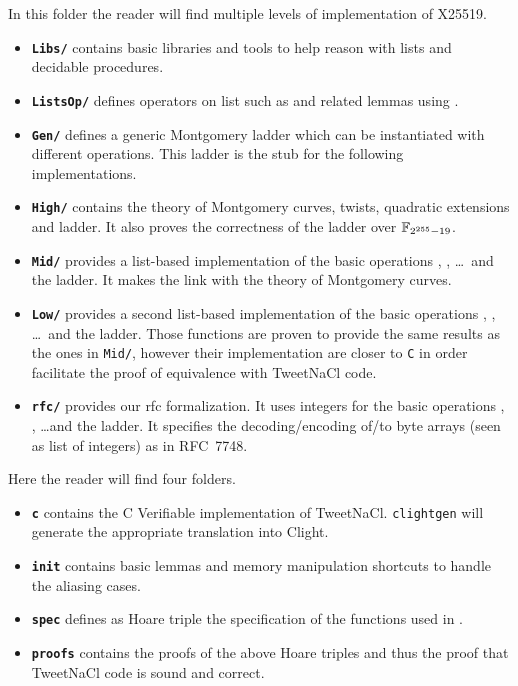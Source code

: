 In this folder the reader will find multiple levels of implementation of X25519.
\begin{itemize}
  \item \textbf{\texttt{Libs/}} contains basic libraries and tools to help
        reason with lists and decidable procedures.
  \item \textbf{\texttt{ListsOp/}} defines operators on list such as
         and related lemmas using \eg {}.
  \item \textbf{\texttt{Gen/}} defines a generic Montgomery ladder which can be
        instantiated with different operations. This ladder is the stub for the
        following implementations.
  \item \textbf{\texttt{High/}} contains the theory of Montgomery curves,
        twists, quadratic extensions and ladder.
        It also proves the correctness of the ladder over $\mathbb{F}_{2^{255}-19}$.
  \item \textbf{\texttt{Mid/}} provides a list-based implementation of the
        basic operations , ,  \ldots~and the ladder. It
        makes the link with the theory of Montgomery curves.
  \item \textbf{\texttt{Low/}} provides a second list-based implementation of
        the basic operations , ,  \ldots~and the ladder.
        Those functions are proven to provide the same results as the ones in
        \texttt{Mid/}, however their implementation are closer to \texttt{C} in order
        facilitate the proof of equivalence with TweetNaCl code.
  \item \textbf{\texttt{rfc/}} provides our rfc formalization.
        It uses integers for the basic operations , , 
        \ldots and the ladder. It specifies the decoding/encoding of/to byte
        arrays (seen as list of integers) as in RFC~7748.
\end{itemize}

Here the reader will find four folders.
\begin{itemize}
  \item \textbf{\texttt{c}} contains the C Verifiable implementation of TweetNaCl.
        \texttt{clightgen} will generate the appropriate translation into Clight.
  \item \textbf{\texttt{init}} contains basic lemmas and memory manipulation
        shortcuts to handle the aliasing cases.
  \item \textbf{\texttt{spec}} defines as Hoare triple the specification of the
        functions used in .
  \item \textbf{\texttt{proofs}} contains the proofs of the above Hoare triples
        and thus the proof that TweetNaCl code is sound and correct.
\end{itemize}
